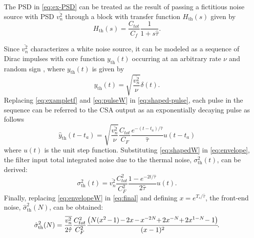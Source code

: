 The PSD in \eqref{eq:ex-PSD} can be treated as the result of passing a fictitious noise source with PSD $\overline{v_n^2}$ through a block with transfer function $H_\text{th}(s)$ given by
	\begin{equation} 
		H_\text{th}(s) =  \frac{C_{tot}}{C_f}\frac{1}{1+s\hat{\tau}}. \label{eq:exampletf}
	\end{equation}

Since $\overline{v_n^2}$ characterizes a white noise source, it can be modeled as a sequence of Dirac impulses with core function $y_\text{th}(t)$ occurring at an arbitrary rate $\nu$ and random sign \citep{pullia102}, where $y_\text{th}(t)$ is given by
	\begin{equation} 
		y_\text{th}(t) = \sqrt{\frac{\overline{v_n^2}}{\nu}}\delta(t)\label{eq:pulseW}.
	\end{equation}
Replacing \eqref{eq:exampletf} and \eqref{eq:pulseW} in \eqref{eq:shaped-pulse}, each pulse in the sequence can be referred to the CSA output as an exponentially decaying pulse \citep{pullia102} as follows
	\begin{equation} 
		\hat{y}_\text{th}(t-t_a)  = \sqrt{\frac{\overline{v_n^2}}{\nu}}\frac{C_{tot}}{C_F} \frac{ e^{-(t-t_a)/\hat{\tau}}}{\hat{\tau}}u(t-t_{a}) \label{eq:shapedW}
	\end{equation}
where $u(t)$ is the unit step function. Substituting \eqref{eq:shapedW} in \eqref{eq:envelope}, the filter input total integrated noise due to the thermal noise, $\sigma_\text{th}^2(t)$, can be derived:
	\begin{equation} 
		\sigma_\text{th}^2(t) = \overline{v_n^2} \frac{C_{tot}^2}{C_F^2}  \frac{1-e^{-2t/\hat{\tau}}}{2\hat{\tau}}u(t). \label{eq:envelopeW}
	\end{equation}
Finally, replacing \eqref{eq:envelopeW} in \eqref{eq:final} and defining $x=e^{T_s/\hat{\tau}}$, the front-end noise, $\hat{\sigma}_\text{th}^2(N)$, can be obtained:
	\begin{equation}
	\hat{\sigma}_\text{th}^2(N)  = \frac{\overline{v_n^2}}{2\hat{\tau}}\frac{C_{tot}^2}{C_F^2}\frac{\left(N(x^2\hspace{-0.1em}-\hspace{-0.1em}1) \hspace{-0.1em}-		\hspace{-0.1em}2x\hspace{-0.1em}-\hspace{-0.1em}x^{-{2N}}\hspace{-0.25em}+\hspace{-0.1em}2x^{-{N}}\hspace{-0.25em}+\hspace{-0.1em}2x^{1-N}		\hspace{-0.2em}-1 \right)}{(x-1)^2}\hspace{-2pt}.   \label{eq:exFinal}
	\end{equation}
	
